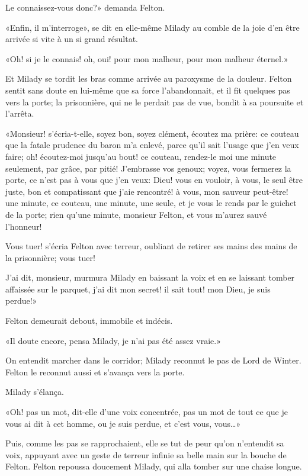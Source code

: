 \speak  Le connaissez-vous donc?» demanda Felton. 

«Enfin, il m'interroge», se dit en elle-même Milady au comble de la joie d'en être arrivée si vite à un si grand résultat. 

«Oh! si je le connais! oh, oui! pour mon malheur, pour mon malheur éternel.» 

Et Milady se tordit les bras comme arrivée au paroxysme de la douleur. Felton sentit sans doute en lui-même que sa force l'abandonnait, et il fit quelques pas vers la porte; la prisonnière, qui ne le perdait pas de vue, bondit à sa poursuite et l'arrêta. 

«Monsieur! s'écria-t-elle, soyez bon, soyez clément, écoutez ma prière: ce couteau que la fatale prudence du baron m'a enlevé, parce qu'il sait l'usage que j'en veux faire; oh! écoutez-moi jusqu'au bout! ce couteau, rendez-le moi une minute seulement, par grâce, par pitié! J'embrasse vos genoux; voyez, vous fermerez la porte, ce n'est pas à vous que j'en veux: Dieu! vous en vouloir, à vous, le seul être juste, bon et compatissant que j'aie rencontré! à vous, mon sauveur peut-être! une minute, ce couteau, une minute, une seule, et je vous le rends par le guichet de la porte; rien qu'une minute, monsieur Felton, et vous m'aurez sauvé l'honneur! 

\speak  Vous tuer! s'écria Felton avec terreur, oubliant de retirer ses mains des mains de la prisonnière; vous tuer! 

\speak  J'ai dit, monsieur, murmura Milady en baissant la voix et en se laissant tomber affaissée sur le parquet, j'ai dit mon secret! il sait tout! mon Dieu, je suis perdue!» 

Felton demeurait debout, immobile et indécis. 

«Il doute encore, pensa Milady, je n'ai pas été assez vraie.» 

On entendit marcher dans le corridor; Milady reconnut le pas de Lord de Winter. Felton le reconnut aussi et s'avança vers la porte. 

Milady s'élança. 

«Oh! pas un mot, dit-elle d'une voix concentrée, pas un mot de tout ce que je vous ai dit à cet homme, ou je suis perdue, et c'est vous, vous\dots» 

Puis, comme les pas se rapprochaient, elle se tut de peur qu'on n'entendit sa voix, appuyant avec un geste de terreur infinie sa belle main sur la bouche de Felton. Felton repoussa doucement Milady, qui alla tomber sur une chaise longue. 

